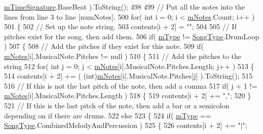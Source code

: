 \begin{DoxyCode}
      \hyperlink{group___song_priv_var_ga2b2dcc0e83e49f7303b6a1371877b25e}{mTimeSignature}.BaseBeat ).ToString();
498 
499         \textcolor{comment}{// Put all the notes into the lines from line 3 to line [numNotes].  }
500         \textcolor{keywordflow}{for}( \textcolor{keywordtype}{int} i = 0; i < \hyperlink{group___song_priv_var_ga674bc904a1f856d485d5fb7fe84bac85}{mNotes}.Count; i++ )
501         \{
502             \textcolor{comment}{// Set up the note string.}
503             contents[i + 2] = \textcolor{stringliteral}{""};
504 
505             \textcolor{comment}{// If pitches exist for the song, then add them.}
506             \textcolor{keywordflow}{if}( \hyperlink{group___song_priv_var_gaf3b9d0f461522324f897b746311b43c5}{mType} != \hyperlink{group___song_enums_gae681a1f001333e39fc1cb4fea97bfe1b}{SongType}.DrumLoop )
507             \{
508                 \textcolor{comment}{// Add the pitches if they exist for this note.}
509                 \textcolor{keywordflow}{if}( \hyperlink{group___song_priv_var_ga674bc904a1f856d485d5fb7fe84bac85}{mNotes}[i].MusicalNote.Pitches != null )
510                 \{
511                     \textcolor{comment}{// Add the pitches to the string}
512                     \textcolor{keywordflow}{for}( \textcolor{keywordtype}{int} j = 0; j < \hyperlink{group___song_priv_var_ga674bc904a1f856d485d5fb7fe84bac85}{mNotes}[i].MusicalNote.Pitches.Length; j++ )
513                     \{
514                         contents[i + 2] += ( (int)\hyperlink{group___song_priv_var_ga674bc904a1f856d485d5fb7fe84bac85}{mNotes}[i].MusicalNote.Pitches[j] ).ToString();
515 
516                         \textcolor{comment}{// If this is not the last pitch of the note, then add a comma}
517                         \textcolor{keywordflow}{if}( j + 1 != \hyperlink{group___song_priv_var_ga674bc904a1f856d485d5fb7fe84bac85}{mNotes}[i].MusicalNote.Pitches.Length )
518                         \{
519                             contents[i + 2] += \textcolor{stringliteral}{","};
520                         \}
521                         \textcolor{comment}{// If this is the last pitch of the note, then add a bar or a semicolon depending
       on if there are drums.}
522                         \textcolor{keywordflow}{else}
523                         \{
524                             \textcolor{keywordflow}{if}( \hyperlink{group___song_priv_var_gaf3b9d0f461522324f897b746311b43c5}{mType} == \hyperlink{group___song_enums_gae681a1f001333e39fc1cb4fea97bfe1b}{SongType}.CombinedMelodyAndPercussion )
525                             \{
526                                 contents[i + 2] += \textcolor{stringliteral}{"|"};

\end{DoxyCode}
